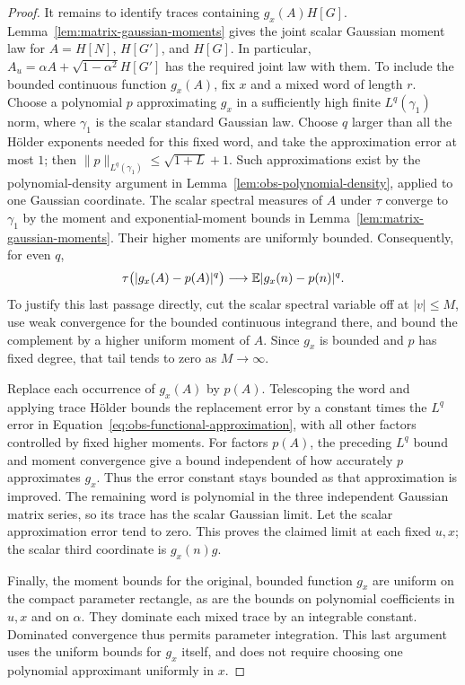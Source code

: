 \begin{proof}
It remains to identify traces containing $g_x(A)H[G]$.
Lemma~\ref{lem:matrix-gaussian-moments} gives the joint scalar
Gaussian moment law for $A=H[N]$, $H[G']$, and $H[G]$.
In particular, $A_u=\alpha A+\sqrt{1-\alpha^2}H[G']$ has the
required joint law with them.  To include the bounded continuous
function $g_x(A)$, fix $x$ and a mixed word of length $r$.
Choose a polynomial $p$ approximating $g_x$ in a sufficiently high
finite $L^q(\gamma_1)$ norm, where $\gamma_1$ is the scalar
standard Gaussian law.  Choose $q$ larger than all the H\"older
exponents needed for this fixed word, and take the approximation
error at most $1$; then $\|p\|_{L^q(\gamma_1)}
\le\sqrt{1+L}+1$.  Such approximations exist by the
polynomial-density argument in
Lemma~\ref{lem:obs-polynomial-density}, applied to one Gaussian
coordinate.  The scalar spectral measures of $A$ under $\tau$
converge to $\gamma_1$ by the moment and exponential-moment bounds
in Lemma~\ref{lem:matrix-gaussian-moments}.  Their higher moments
are uniformly bounded.  Consequently, for even $q$,
\begin{equation}\label{eq:obs-functional-approximation}
 \tau\bigl(|g_x(A)-p(A)|^q\bigr)
 \longrightarrow\mathbb E|g_x(n)-p(n)|^q.
\end{equation}
To justify this last passage directly, cut the scalar spectral
variable off at $|v|\le M$, use weak convergence for the bounded
continuous integrand there, and bound the complement by a higher
uniform moment of $A$.  Since $g_x$ is bounded and $p$ has fixed
degree, that tail tends to zero as $M\to\infty$.

Replace each occurrence of $g_x(A)$ by $p(A)$.  Telescoping the
word and applying trace H\"older bounds the replacement error
by a constant times the $L^q$ error in
Equation~\eqref{eq:obs-functional-approximation}, with all other
factors controlled by fixed higher moments.  For factors $p(A)$,
the preceding $L^q$ bound and moment convergence give a bound
independent of how accurately $p$ approximates $g_x$.
Thus the error constant stays bounded as that approximation is
improved.  The remaining word
is polynomial in the three independent Gaussian matrix series,
so its trace has the scalar Gaussian limit.  Let the scalar
approximation error tend to zero.  This proves the claimed limit
at each fixed $u,x$; the scalar third coordinate is
$g_x(n)g$.

Finally, the moment bounds for the original, bounded function
$g_x$ are uniform on the compact parameter rectangle, as are the
bounds on polynomial coefficients in $u,x$ and on $\alpha$.
They dominate each mixed trace by an integrable constant.
Dominated convergence thus permits parameter integration.  This
last argument uses the uniform bounds for $g_x$ itself, and does
not require choosing one polynomial approximant uniformly in $x$.
\end{proof}

